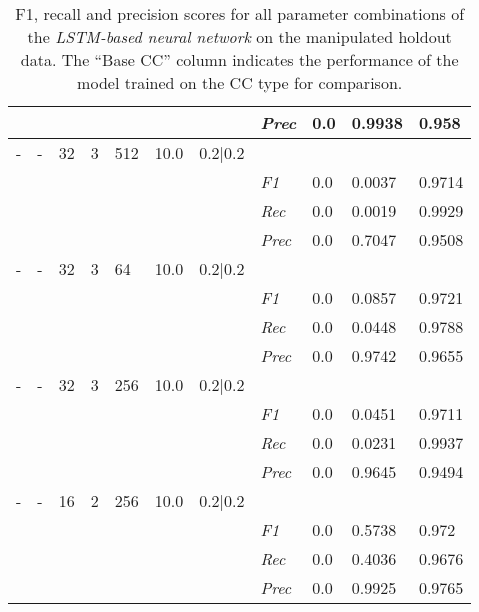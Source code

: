 \begin{table}[H]
\begin{tabularx}{\textwidth}{XXXXXXX|X|X|X|X}
    & & & & & & & \textit{Prec} & 0.0 & 0.9938 & 0.958 \\ \midrule
    - & - & 32 & 3 & 512 &10.0 & 0.2|0.2 & & & & \\
    & & & & & & & \textit{F1} & 0.0 & 0.0037 & 0.9714       \\
    & & & & & & & \textit{Rec} &  0.0 & 0.0019  & 0.9929  \\
    & & & & & & & \textit{Prec} & 0.0 & 0.7047 & 0.9508 \\ \midrule
    - & - & 32 & 3 & 64 &10.0 & 0.2|0.2 & & & & \\
    & & & & & & & \textit{F1} & 0.0 & 0.0857 & 0.9721       \\
    & & & & & & & \textit{Rec} &  0.0 & 0.0448  & 0.9788  \\
    & & & & & & & \textit{Prec} & 0.0 & 0.9742 & 0.9655 \\ \midrule
    - & - & 32 & 3 & 256 &10.0 & 0.2|0.2 & & & & \\
    & & & & & & & \textit{F1} & 0.0 & 0.0451 & 0.9711       \\
    & & & & & & & \textit{Rec} &  0.0 & 0.0231  & 0.9937  \\
    & & & & & & & \textit{Prec} & 0.0 & 0.9645 & 0.9494 \\ \midrule
    - & - & 16 & 2 & 256 &10.0 & 0.2|0.2 & & & & \\
    & & & & & & & \textit{F1} & 0.0 & 0.5738 & 0.972       \\
    & & & & & & & \textit{Rec} &  0.0 & 0.4036  & 0.9676  \\
    & & & & & & & \textit{Prec} & 0.0 & 0.9925 & 0.9765 \\ \midrule
    \end{tabularx}
    \caption{F1, recall and precision scores for all parameter combinations of the \textit{LSTM-based neural network} on the manipulated holdout data. The \enquote{Base CC} column indicates the performance of the model trained on the CC type for comparison. }
    \label{tab:rq3_lstm}
    \end{table}